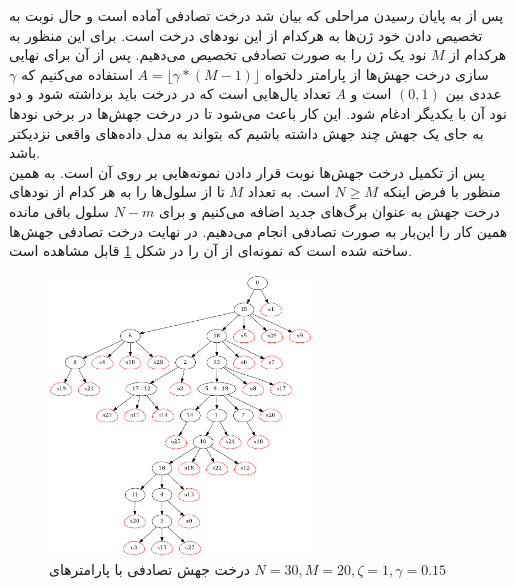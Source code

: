 پس از به پایان رسیدن مراحلی که بیان شد درخت تصادفی آماده است و حال نوبت به تخصیص دادن خود ژن‌ها به هرکدام از این نودهای درخت است. برای این منظور به هرکدام از $M$ نود یک ژن را به صورت تصادفی تخصیص می‌دهیم. پس از آن برای نهایی سازی درخت جهش‌ها از پارامتر دلخواه 	$A = \lfloor\gamma*(M-1)\rfloor$ استفاده می‌کنیم که $\gamma$ عددی بین $(0,1)$ است و $A$ تعداد یال‌هایی است که در درخت باید برداشته شود و دو نود آن با یکدیگر ادغام شود. این کار باعث می‌شود تا در درخت جهش‌ها در برخی نودها به جای یک جهش چند جهش داشته باشیم که بتواند به مدل داده‌های واقعی نزدیکتر باشد.
\\
پس از تکمیل درخت جهش‌ها نوبت قرار دادن نمونه‌هایی بر روی آن است. به همین منظور با فرض اینکه $N\ge M$ است. به تعداد $M$ تا از سلول‌ها را به هر کدام از نودهای درخت جهش به عنوان برگ‌های جدید اضافه می‌کنیم و برای $N-m$ سلول باقی مانده همین کار را این‌بار به صورت تصادفی انجام می‌دهیم. در نهایت درخت تصادفی جهش‌ها ساخته شده است که نمونه‌ای از آن را در شکل \ref{fig:mtn30m20z1g0.15} قابل مشاهده است.
\begin{figure}
	\centering
	\includegraphics[width=0.62\textwidth]{img/dataset/s/treeF_zeta=1_gamma=0.15_alpha=0.01_beta=0.1_MR=0.02_N=30_M=20.png}
	\caption{درخت جهش تصادفی با پارامتر‌های $N=30, M=20, \zeta=1, \gamma=0.15$}
	\label{fig:mtn30m20z1g0.15}
\end{figure}


